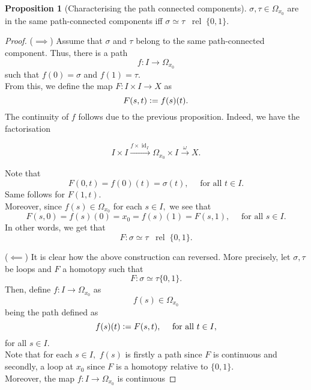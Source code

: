 \documentclass[12pt]{article}
\theoremstyle{definition}
\numberwithin{thm}{section}
\newtheorem{prop}[thm]{Proposition}
\newcommand{\rel}{\;\;\operatorname{rel}\;}
\newcommand{\id}{\operatorname{id}}
\begin{document}
\begin{prop}[Characterising the path connected components]
	$\sigma, \tau \in \Omega_{x_0}$ are in the same path-connected components iff $\sigma \simeq \tau \rel \{0, 1\}.$
\end{prop}
\begin{proof} 
	($\implies$) Assume that $\sigma$ and $\tau$ belong to the same path-connected component. Thus, there is a path
	\begin{equation*} 
		f:I \to \Omega_{x_0}
	\end{equation*}
	such that $f(0) = \sigma$ and $f(1) = \tau.$\\
	From this, we define the map $F:I\times I \to X$ as
	\begin{equation*} 
		F(s, t) \vcentcolon= f(s)(t).
	\end{equation*}
	The continuity of $f$ follows due to the previous proposition. Indeed, we have the factorisation

	\begin{equation*} 
		I \times I \overset{f \times \id_I}{\longrightarrow} \Omega_{x_0}\times I \overset{\omega}{\longrightarrow} X.	
	\end{equation*}

	Note that
	\begin{equation*} 
		F(0, t) = f(0)(t) = \sigma(t), \quad \text{ for all } t \in I.
	\end{equation*}
	Same follows for $F(1, t).$\\
	Moreover, since $f(s) \in \Omega_{x_0}$ for each $s \in I,$ we see that
	\begin{equation*} 
		F(s, 0) = f(s)(0) = x_0 = f(s)(1) = F(s, 1), \quad \text{ for all } s \in I.
	\end{equation*}
	In other words, we get that
	\begin{equation*} 
		F:\sigma\simeq\tau\rel\{0, 1\}.
	\end{equation*}

	($\impliedby$) It is clear how the above construction can reversed. More precisely, let $\sigma, \tau$ be loops and $F$ a homotopy such that
	\begin{equation*} 
		F:\sigma\simeq\tau\{0, 1\}.
	\end{equation*}
	Then, define $f:I \to \Omega_{x_0}$ as
	\begin{equation*} 
		f(s) \in \Omega_{x_0}
	\end{equation*}
	being the path defined as
	\begin{equation*} 
		f(s)(t) \vcentcolon= F(s, t), \quad \text{ for all } t \in I,
	\end{equation*}
	for all $s \in I.$\\
	Note that for each $s \in I,$ $f(s)$ is firstly a path since $F$ is continuous and secondly, a loop at $x_0$ since $F$ is a homotopy relative to $\{0, 1\}.$\\
	Moreover, the map $f:I\to \Omega_{x_0}$ is continuous
\end{proof}
\end{document}
